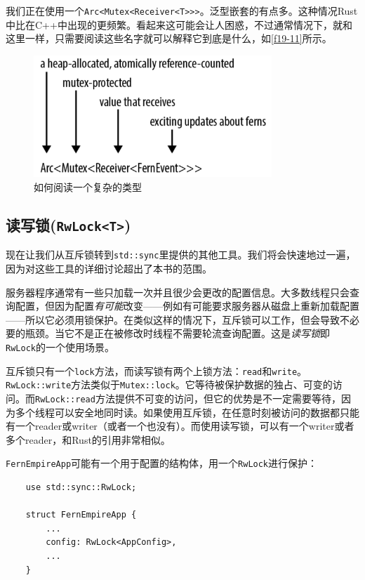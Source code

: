 我们正在使用一个\texttt{Arc<Mutex<Receiver<T>>>}。泛型嵌套的有点多。这种情况Rust中比在C++中出现的更频繁。看起来这可能会让人困惑，不过通常情况下，就和这里一样，只需要阅读这些名字就可以解释它到底是什么，如\autoref{f19-11}所示。

\begin{figure}[htbp]
    \centering
    \includegraphics[width=0.8\textwidth]{../img/f19-11.png}
    \caption{如何阅读一个复杂的类型}
    \label{f19-11}
\end{figure}

\subsection{读写锁(\texttt{RwLock<T>})}
现在让我们从互斥锁转到\texttt{std::sync}里提供的其他工具。我们将会快速地过一遍，因为对这些工具的详细讨论超出了本书的范围。

服务器程序通常有一些只加载一次并且很少会更改的配置信息。大多数线程只会查询配置，但因为配置\emph{有可能}改变——例如有可能要求服务器从磁盘上重新加载配置——所以它必须用锁保护。在类似这样的情况下，互斥锁可以工作，但会导致不必要的瓶颈。当它不是正在被修改时线程不需要轮流查询配置。这是\emph{读写锁}即\texttt{RwLock}的一个使用场景。

互斥锁只有一个\texttt{lock}方法，而读写锁有两个上锁方法：\texttt{read}和\texttt{write}。\texttt{RwLock::write}方法类似于\texttt{Mutex::lock}。它等待被保护数据的独占、可变的访问。而\texttt{RwLock::read}方法提供不可变的访问，但它的优势是不一定需要等待，因为多个线程可以安全地同时读。如果使用互斥锁，在任意时刻被访问的数据都只能有一个reader或writer（或者一个也没有）。而使用读写锁，可以有一个writer或者多个reader，和Rust的引用非常相似。

\texttt{FernEmpireApp}可能有一个用于配置的结构体，用一个\texttt{RwLock}进行保护：
\begin{verbatim}
    use std::sync::RwLock;

    struct FernEmpireApp {
        ...
        config: RwLock<AppConfig>,
        ...
    }
\end{verbatim}

